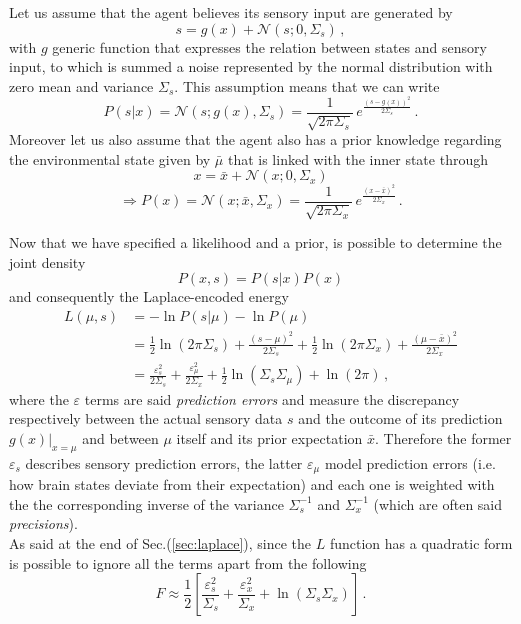 \documentclass[a4paper, 10pt]{article}
\begin{document}
Let us assume that the agent believes its sensory input are generated by
\begin{equation}
s = g(x) + \mathcal{N}(s;0,\Sigma_s) \, ,
\label{eqn:input}
\end{equation}
with $g$ generic function that expresses the relation between states and sensory input, to which is summed a noise represented by the normal distribution with zero mean and variance $\Sigma_s$. This assumption means that we can write
\begin{equation}
P(s|x) = \mathcal{N}(s;g(x),\Sigma_s) = \frac{1}{\sqrt{ 2 \pi \Sigma_{s}}} \, e^{\frac{(s-g(x))^2}{2 \Sigma_{s}}} \, .
\end{equation}
Moreover let us also assume that the agent also has a prior knowledge regarding the environmental state given by $\bar{\mu}$ that is linked with the inner state through
\begin{equation}
x = \bar{x} + \mathcal{N}(x;0,\Sigma_{x})
\end{equation}
\begin{equation}
\Rightarrow P(x) = \mathcal{N}(x;\bar{x},\Sigma_{x}) =\frac{1}{\sqrt{ 2 \pi \Sigma_{x}}} \, e^{\frac{(x-\bar{x})^2}{2 \Sigma_{x}}} \, .
\end{equation}

Now that we have specified a likelihood and a prior, is possible to determine the joint density
\begin{equation}
P(x,s) = P(s | x) P(x)
\end{equation}
and consequently the Laplace-encoded energy
\begin{equation}
\begin{split}
L(\mu,s) & = - \ln P(s|\mu) - \ln P(\mu)  \\
		 & = \frac{1}{2} \ln (2 \pi \Sigma_{s}) + \frac{(s-\mu)^2}{2 \Sigma_{s}} + \frac{1}{2} \ln (2 \pi \Sigma_{x}) + \frac{(\mu-\bar{x})^2}{2 \Sigma_{x}} \\
		 & = \frac{\varepsilon_{s}^2}{2 \Sigma_{s}} + \frac{\varepsilon_{\mu}^2}{2 \Sigma_{x}} + \frac{1}{2} \ln \left( \Sigma_{s} \Sigma_{\mu} \right) + \ln (2 \pi) \, ,
\end{split}
\end{equation}
where the $\varepsilon$ terms are said \emph{prediction errors} and measure the discrepancy respectively between the actual sensory data $s$ and the outcome of its prediction $g(x)|_{x=\mu}$ and between $\mu$ itself and its prior expectation $\bar{x}$. Therefore the former $\varepsilon_{s}$ describes sensory prediction errors, the latter $\varepsilon_{\mu}$ model prediction errors (i.e. how brain states deviate from their expectation) and each one is weighted with the the corresponding inverse of the variance $\Sigma_{s}^{-1}$ and $\Sigma_{x}^{-1}$ (which are often said \emph{precisions}). \\
As said at the end of Sec.(\ref{sec:laplace}), since the $L$ function has a quadratic form is possible to ignore all the terms apart from the following
\begin{equation}
F \approx \frac{1}{2} \left[\frac{\varepsilon_{s}^2}{\Sigma_{s}} + \frac{\varepsilon_{x}^2}{ \Sigma_{x}} + \ln \left( \Sigma_{s} \Sigma_{x} \right) \right] \, .
\end{equation}
\end{document}
